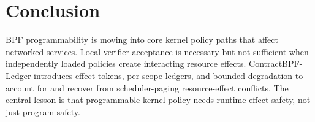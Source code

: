 \documentclass[letterpaper,twocolumn,10pt]{article}
\newcommand{\sys}{ContractBPF-Ledger\xspace}
\begin{document}
\section{Conclusion}

BPF programmability is moving into core kernel policy paths that affect networked services. Local verifier acceptance is necessary but not sufficient when independently loaded policies create interacting resource effects. \sys introduces effect tokens, per-scope ledgers, and bounded degradation to account for and recover from scheduler-paging resource-effect conflicts. The central lesson is that programmable kernel policy needs runtime effect safety, not just program safety.



\end{document}
